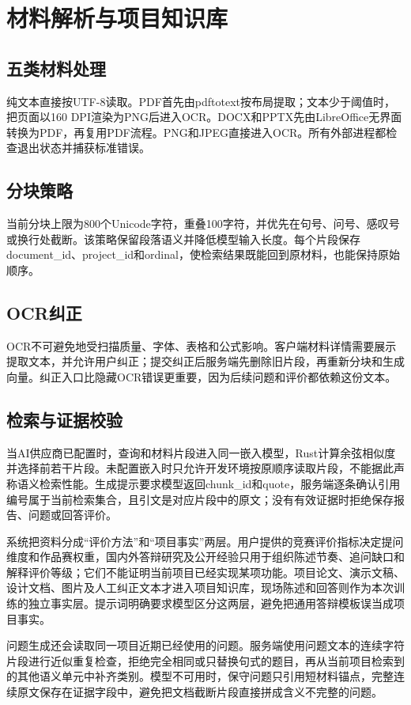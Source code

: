 \chapter{材料解析与项目知识库}
\section{五类材料处理}
纯文本直接按UTF-8读取。PDF首先由pdftotext按布局提取；文本少于阈值时，把页面以160 DPI渲染为PNG后进入OCR。DOCX和PPTX先由LibreOffice无界面转换为PDF，再复用PDF流程。PNG和JPEG直接进入OCR。所有外部进程都检查退出状态并捕获标准错误。

\section{分块策略}
当前分块上限为800个Unicode字符，重叠100字符，并优先在句号、问号、感叹号或换行处截断。该策略保留段落语义并降低模型输入长度。每个片段保存document\_id、project\_id和ordinal，使检索结果既能回到原材料，也能保持原始顺序。

\section{OCR纠正}
OCR不可避免地受扫描质量、字体、表格和公式影响。客户端材料详情需要展示提取文本，并允许用户纠正；提交纠正后服务端先删除旧片段，再重新分块和生成向量。纠正入口比隐藏OCR错误更重要，因为后续问题和评价都依赖这份文本。

\section{检索与证据校验}
当AI供应商已配置时，查询和材料片段进入同一嵌入模型，Rust计算余弦相似度并选择前若干片段。未配置嵌入时只允许开发环境按原顺序读取片段，不能据此声称语义检索性能。生成提示要求模型返回chunk\_id和quote，服务端逐条确认引用编号属于当前检索集合，且引文是对应片段中的原文；没有有效证据时拒绝保存报告、问题或回答评价。

系统把资料分成“评价方法”和“项目事实”两层。用户提供的竞赛评价指标决定提问维度和作品赛权重，国内外答辩研究及公开经验只用于组织陈述节奏、追问缺口和解释评价等级；它们不能证明当前项目已经实现某项功能。项目论文、演示文稿、设计文档、图片及人工纠正文本才进入项目知识库，现场陈述和回答则作为本次训练的独立事实层。提示词明确要求模型区分这两层，避免把通用答辩模板误当成项目事实。

问题生成还会读取同一项目近期已经使用的问题。服务端使用问题文本的连续字符片段进行近似重复检查，拒绝完全相同或只替换句式的题目，再从当前项目检索到的其他语义单元中补齐类别。模型不可用时，保守问题只引用短材料锚点，完整连续原文保存在证据字段中，避免把文档截断片段直接拼成含义不完整的问题。

